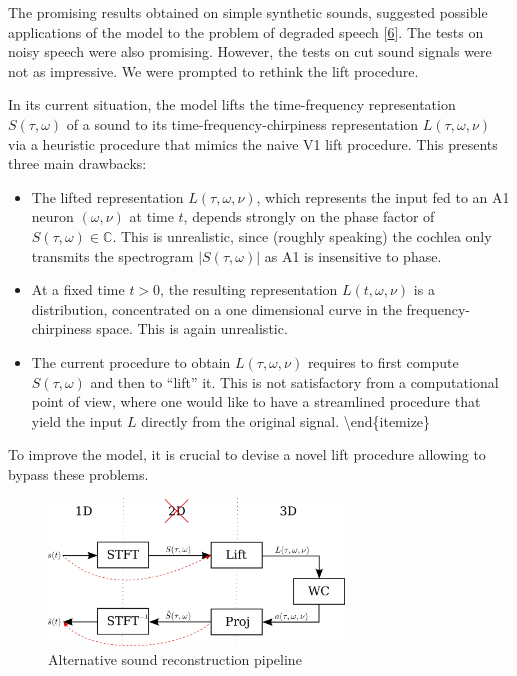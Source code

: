\documentclass[american,]{article}
\providecommand{\tightlist}{%
  \setlength{\itemsep}{0pt}\setlength{\parskip}{0pt}}
\theoremstyle{definition}
\theoremstyle{definition}
\theoremstyle{definition}
\theoremstyle{remark}
\begin{document}
The promising results obtained on simple synthetic sounds,
suggested possible applications of the model to the problem
of degraded speech {[}\protect\hyperlink{ref-boscain2021}{6}{]}.
The tests on noisy speech were also promising.
However, the tests on cut sound signals were not as impressive.
We were prompted to rethink the lift procedure.

In its current situation, the model lifts the time-frequency representation \(S(\tau,\omega)\)
of a sound to its time-frequency-chirpiness representation \(L(\tau,\omega,\nu)\)
via a heuristic procedure that mimics the naive V1 lift procedure.
This presents three main drawbacks:

\begin{itemize}
\tightlist
\item
  The lifted representation \(L(\tau,\omega,\nu)\), which represents the input fed to an A1 neuron
  \((\omega,\nu)\) at time \(t\), depends strongly on the phase factor of \(S(\tau,\omega)\in\mathbb{C}\).
  This is unrealistic, since (roughly speaking) the cochlea only transmits the spectrogram
  \(\left\lvert S(\tau,\omega)\right\rvert\) as A1 is insensitive to phase.
\item
  At a fixed time \(t>0\), the resulting representation \(L(t,\omega,\nu)\) is a distribution,
  concentrated on a one dimensional curve in the frequency-chirpiness space.
  This is again unrealistic.
\item
  The current procedure to obtain \(L(\tau,\omega,\nu)\) requires to first compute \(S(\tau,\omega)\)
  and then to ``lift'' it.
  This is not satisfactory from a computational point of view, where one would like to have
  a streamlined procedure that yield the input \(L\) directly from the original signal.
  \textbackslash{}end\{itemize\}
\end{itemize}

To improve the model, it is crucial to devise a novel lift procedure allowing to bypass these problems.

\begin{figure}
\centering
\includegraphics[width=0.7\textwidth,height=\textheight]{img/new_pipeline.png}
\caption{Alternative sound reconstruction pipeline}
\end{figure}
\end{document}
